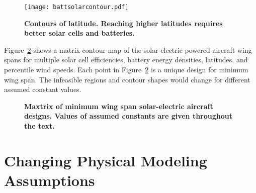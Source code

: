 \begin{figure}[h!]
	\begin{center}
	\texttt{[image: battsolarcontour.pdf]}
    \caption{\textbf{Contours of latitude. Reaching higher latitudes requires better solar cells and batteries.}}
	\label{f:battsolarcontour}
	\end{center}
\end{figure}


Figure~\ref{f:solarcontours} shows a matrix contour map of the solar-electric powered aircraft wing spans for multiple solar cell efficiencies, battery energy densities, latitudes, and percentile wind speeds.
Each point in Figure~\ref{f:solarcontours} is a unique design for minimum wing span. 
The infeasible regions and contour shapes would change for different assumed constant values. 

 \begin{figure}[H]
 \begin{subfigmatrix}{3}%
 \end{subfigmatrix}
 \caption{\textbf{Maxtrix of minimum wing span solar-electric aircraft designs. Values of assumed constants are given throughout the text.}}
 \label{f:solarcontours}
\end{figure}

\section{Changing Physical Modeling Assumptions}

